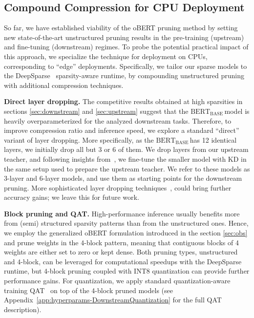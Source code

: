 \documentclass[11pt]{article}
\newcommand{\bert}{$\textrm{BERT}_{\textrm{BASE}}\,$}
\begin{document}
\subsection{Compound Compression for CPU Deployment}
\label{sec:compound}

So far, we have established viability of the oBERT pruning method by setting new state-of-the-art unstructured pruning results in the pre-training (upstream) and fine-tuning (downstream) regimes. To probe the potential practical impact of this approach, we specialize the technique for deployment on CPUs, corresponding to ``edge'' deployments. Specifically, we tailor our sparse models to the DeepSparse~\cite{deepsparse} sparsity-aware runtime, by compounding unstructured pruning with additional compression techniques.  

\noindent\textbf{Direct layer dropping.} The competitive results obtained at high sparsities in sections \ref{sec:downstream} and \ref{sec:upstream} suggest that the \bert model is heavily overparameterized for the analyzed downstream tasks. Therefore, to improve compression ratio and inference speed, we explore a standard ``direct'' variant of layer dropping. More specifically, as the \bert has 12 identical layers, we initially drop all but 3 or 6 of them. We drop layers from our upstream teacher, and following insights from~\cite{Turc2019WellReadSL}, we fine-tune the smaller model with KD in the same setup used to prepare the upstream teacher. We refer to these models as 3-layer and 6-layer models, and use them as starting points for the downstream pruning. More sophisticated layer dropping techniques~\cite{fan2019reducing}, could bring further accuracy gains; we leave this for future work.

\noindent\textbf{Block pruning and QAT.} High-performance inference usually benefits more from (semi) structured sparsity patterns than from the unstructured ones. Hence, we employ the generalized oBERT formulation introduced in the section \ref{sec:obs} and prune weights in the 4-block pattern, meaning that contiguous blocks of 4 weights are either set to zero or kept dense. Both pruning types, unstructured and 4-block, can be leveraged for computational speedups with the DeepSparse runtime, but 4-block pruning coupled with INT8 quantization can provide further performance gains. For quantization, we apply standard quantization-aware training QAT~\cite{jacob2018quantization} on top of the 4-block pruned models (see Appendix~\ref{app:hyperparams-DownstreamQuantization} for the full QAT description).
\end{document}
